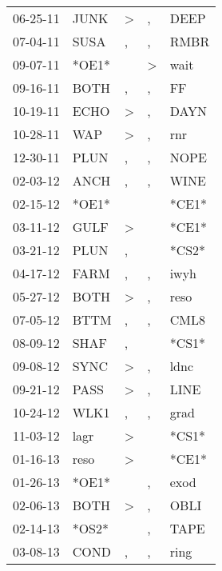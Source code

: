 \begin{supertabular}{lllll}
 06-25-11 &   JUNK &     \textgreater &                , &   DEEP \\
 07-04-11 &   SUSA &                , &                , &   RMBR \\
 09-07-11 &  *OE1* &                  &     \textgreater &   wait \\
 09-16-11 &   BOTH &                , &                , &     FF \\
 10-19-11 &   ECHO &     \textgreater &                , &   DAYN \\
 10-28-11 &    WAP &     \textgreater &                , &    rnr \\
 12-30-11 &   PLUN &                , &                , &   NOPE \\
 02-03-12 &   ANCH &                , &                , &   WINE \\
 02-15-12 &  *OE1* &                  &                  &  *CE1* \\
 03-11-12 &   GULF &     \textgreater &                  &  *CE1* \\
 03-21-12 &   PLUN &                , &                  &  *CS2* \\
 04-17-12 &   FARM &                , &                , &   iwyh \\
 05-27-12 &   BOTH &     \textgreater &                , &   reso \\
 07-05-12 &   BTTM &                , &                , &   CML8 \\
 08-09-12 &   SHAF &                , &                  &  *CS1* \\
 09-08-12 &   SYNC &     \textgreater &                , &   ldnc \\
 09-21-12 &   PASS &     \textgreater &                , &   LINE \\
 10-24-12 &   WLK1 &                , &                , &   grad \\
 11-03-12 &   lagr &     \textgreater &                  &  *CS1* \\
 01-16-13 &   reso &     \textgreater &                  &  *CE1* \\
 01-26-13 &  *OE1* &                  &                , &   exod \\
 02-06-13 &   BOTH &     \textgreater &                , &   OBLI \\
 02-14-13 &  *OS2* &                  &                , &   TAPE \\
 03-08-13 &   COND &                , &                , &   ring \\

\end{supertabular}

